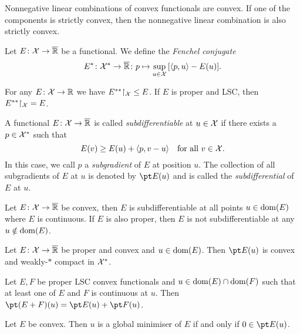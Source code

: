 \begin{lemma}
	Nonnegative linear combinations of convex functionals are convex. If one of the components is strictly convex, then the nonnegative linear combination is also strictly convex. 
\end{lemma}

\begin{definition}
	Let $E \colon \mathcal X \to \overline{\mathbb R}$ be a functional. We define the \emph{Fenchel conjugate}
	\[
	E^* \colon \mathcal X^* \to \overline{\mathbb R} \colon p \mapsto \sup_{u \in \mathcal X} \qty[ \langle p, u\rangle - E(u)]. 
	\]
\end{definition}

\begin{theorem}
	For any $E \colon \mathcal X \to \mathbb R$ we have $E^{**} \mathord\restriction_{\mathcal X} \leq E$. If $E$ is proper and LSC, then $E^{**} \mathord\restriction_{\mathcal X} = E$. 
\end{theorem}

\begin{definition}
	A functional $E \colon \mathcal X \to \overline{\mathbb R}$ is called \emph{subdifferentiable} at $u \in \mathcal X$ if there exists a $p \in \mathcal X^*$ such that
	\[
	E(v) \geq E(u) + \langle p, v - u\rangle \quad\text{for all $v \in \mathcal X$}. 
	\]
	In this case, we call $p$ a \emph{subgradient} of $E$ at position $u$. The collection of all subgradients of $E$ at $u$ is denoted by $\pt E(u)$ and is called the \emph{subdifferential} of $E$ at $u$. 
\end{definition}

\begin{lemma}
	Let $E \colon \mathcal X \to \overline{\mathbb R}$ be convex, then $E$ is subdifferentiable at all points $u \in \operatorname{dom}(E)$ where $E$ is continuous. If $E$ is also proper, then $E$ is not subdifferentiable at any $u \notin \operatorname{dom}(E)$. 
\end{lemma}

\begin{theorem}
	Let $E \colon \mathcal X \to \overline{\mathbb R}$ be proper and convex and $u \in \operatorname{dom}(E)$. Then $\pt E(u)$ is convex and weakly-$*$ compact in $\mathcal X^*$. 
\end{theorem}

\begin{theorem}
	Let $E, F$ be proper LSC convex functionals and $u \in \operatorname{dom}(E) \cap \operatorname{dom}(F)$ such that at least one of $E$ and $F$ is continuous at $u$. Then $\pt(E + F)(u) = \pt E(u) + \pt F(u)$. 
\end{theorem}

\begin{theorem}
	Let $E$ be convex. Then $u$ is a global minimiser of $E$ if and only if $0 \in \pt E(u)$. 
\end{theorem}


